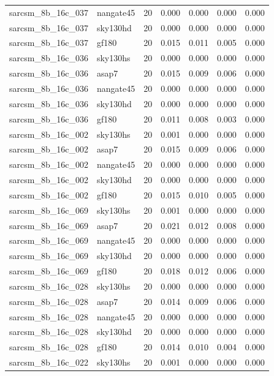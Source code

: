 \begin{tabular}{llrrrrr}
sarcsm\_8b\_16c\_037 & nangate45 & 20 & 0.000 & 0.000 & 0.000 & 0.000 \\
sarcsm\_8b\_16c\_037 & sky130hd & 20 & 0.000 & 0.000 & 0.000 & 0.000 \\
sarcsm\_8b\_16c\_037 & gf180 & 20 & 0.015 & 0.011 & 0.005 & 0.000 \\
sarcsm\_8b\_16c\_036 & sky130hs & 20 & 0.000 & 0.000 & 0.000 & 0.000 \\
sarcsm\_8b\_16c\_036 & asap7 & 20 & 0.015 & 0.009 & 0.006 & 0.000 \\
sarcsm\_8b\_16c\_036 & nangate45 & 20 & 0.000 & 0.000 & 0.000 & 0.000 \\
sarcsm\_8b\_16c\_036 & sky130hd & 20 & 0.000 & 0.000 & 0.000 & 0.000 \\
sarcsm\_8b\_16c\_036 & gf180 & 20 & 0.011 & 0.008 & 0.003 & 0.000 \\
sarcsm\_8b\_16c\_002 & sky130hs & 20 & 0.001 & 0.000 & 0.000 & 0.000 \\
sarcsm\_8b\_16c\_002 & asap7 & 20 & 0.015 & 0.009 & 0.006 & 0.000 \\
sarcsm\_8b\_16c\_002 & nangate45 & 20 & 0.000 & 0.000 & 0.000 & 0.000 \\
sarcsm\_8b\_16c\_002 & sky130hd & 20 & 0.000 & 0.000 & 0.000 & 0.000 \\
sarcsm\_8b\_16c\_002 & gf180 & 20 & 0.015 & 0.010 & 0.005 & 0.000 \\
sarcsm\_8b\_16c\_069 & sky130hs & 20 & 0.001 & 0.000 & 0.000 & 0.000 \\
sarcsm\_8b\_16c\_069 & asap7 & 20 & 0.021 & 0.012 & 0.008 & 0.000 \\
sarcsm\_8b\_16c\_069 & nangate45 & 20 & 0.000 & 0.000 & 0.000 & 0.000 \\
sarcsm\_8b\_16c\_069 & sky130hd & 20 & 0.000 & 0.000 & 0.000 & 0.000 \\
sarcsm\_8b\_16c\_069 & gf180 & 20 & 0.018 & 0.012 & 0.006 & 0.000 \\
sarcsm\_8b\_16c\_028 & sky130hs & 20 & 0.000 & 0.000 & 0.000 & 0.000 \\
sarcsm\_8b\_16c\_028 & asap7 & 20 & 0.014 & 0.009 & 0.006 & 0.000 \\
sarcsm\_8b\_16c\_028 & nangate45 & 20 & 0.000 & 0.000 & 0.000 & 0.000 \\
sarcsm\_8b\_16c\_028 & sky130hd & 20 & 0.000 & 0.000 & 0.000 & 0.000 \\
sarcsm\_8b\_16c\_028 & gf180 & 20 & 0.014 & 0.010 & 0.004 & 0.000 \\
sarcsm\_8b\_16c\_022 & sky130hs & 20 & 0.001 & 0.000 & 0.000 & 0.000 \\

\end{tabular}

